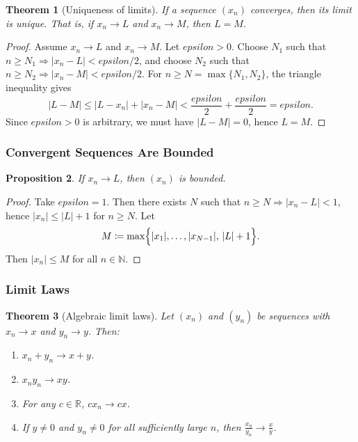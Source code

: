 \documentclass[12pt]{article}
\numberwithin{equation}{section}
\def\abs#1{|#1|}
\def\eps{epsilon}
\newcommand{\RR}{\mathbb{R}}
\newcommand{\NN}{\mathbb{N}}
\DeclarePairedDelimiter{\abs}{\lvert}{\rvert}
\newcommand{\eps}{\varepsilon}               %
\theoremstyle{plain}
\newtheorem{theorem}{Theorem}[section]
\newtheorem{proposition}[theorem]{Proposition}
\theoremstyle{definition}
\theoremstyle{remark}
\begin{document}
\begin{theorem}[Uniqueness of limits]\label{thm:unique-limit}
If a sequence $(x_n)$ converges, then its limit is unique.
That is, if $x_n\to L$ and $x_n\to M$, then $L=M$.
\end{theorem}

\begin{proof}
Assume $x_n\to L$ and $x_n\to M$. Let $\eps>0$.
Choose $N_1$ such that $n\ge N_1\Rightarrow \abs{x_n-L}<\eps/2$, and choose $N_2$ such that $n\ge N_2\Rightarrow \abs{x_n-M}<\eps/2$.
For $n\ge N=\max\{N_1,N_2\}$, the triangle inequality gives
\[
\abs{L-M}\le \abs{L-x_n}+\abs{x_n-M}<\frac{\eps}{2}+\frac{\eps}{2}=\eps.
\]
Since $\eps>0$ is arbitrary, we must have $\abs{L-M}=0$, hence $L=M$.
\end{proof}

\subsubsection{Convergent Sequences Are Bounded}

\begin{proposition}\label{prop:conv-bdd}
If $x_n\to L$, then $(x_n)$ is bounded.
\end{proposition}

\begin{proof}
Take $\eps=1$. Then there exists $N$ such that $n\ge N \Rightarrow \abs{x_n-L}<1$, hence $\abs{x_n}\le \abs{L}+1$ for $n\ge N$.
Let
\[
M \coloneqq \max\Bigl\{\abs{x_1},\dots,\abs{x_{N-1}},\,\abs{L}+1\Bigr\}.
\]
Then $\abs{x_n}\le M$ for all $n\in\NN$.
\end{proof}

\subsubsection{Limit Laws}

\begin{theorem}[Algebraic limit laws]\label{thm:limit-laws}
Let $(x_n)$ and $(y_n)$ be sequences with $x_n\to x$ and $y_n\to y$.
Then:
\begin{enumerate}[label=(\alph*)]
\item $x_n+y_n\to x+y$.
\item $x_ny_n\to xy$.
\item For any $c\in\RR$, $cx_n\to cx$.
\item If $y\neq 0$ and $y_n\neq 0$ for all sufficiently large $n$, then $\frac{x_n}{y_n}\to \frac{x}{y}$.
\end{enumerate}
\end{theorem}
\end{document}
